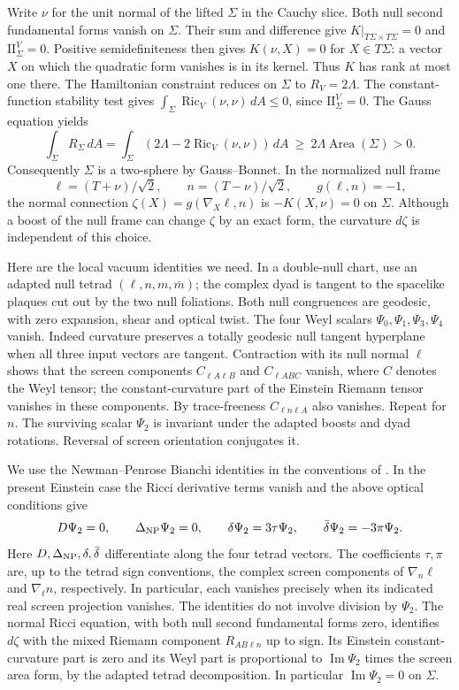 \documentclass[11pt]{article}
\DeclareMathOperator{\Ric}{Ric}
\begin{document}
Write $\nu$ for the unit normal of the lifted $\Sigma$ in the Cauchy
slice. Both null second fundamental forms vanish on $\Sigma$.
Their sum and difference give $K|_{T\Sigma\times T\Sigma}=0$ and
$\mathrm{II}^{V}_\Sigma=0$. Positive semidefiniteness then gives
$K(\nu,X)=0$ for $X\in T\Sigma$: a vector $X$ on which the quadratic
form vanishes is in its kernel. Thus $K$ has rank at most one there.
The Hamiltonian constraint reduces on $\Sigma$ to $R_V=2\Lambda$.
The constant-function stability test gives
$\int_\Sigma \Ric_V(\nu,\nu)\,dA\leq0$, since
$\mathrm{II}^{V}_\Sigma=0$. The Gauss equation yields
\[
 \int_\Sigma R_\Sigma\,dA
   =\int_\Sigma (2\Lambda-2\Ric_V(\nu,\nu))\,dA
   \ \geq\ 2\Lambda\operatorname{Area}(\Sigma)>0.
\]
Consequently $\Sigma$ is a two-sphere by Gauss--Bonnet. In the normalized
null frame
\[
 \ell=(T+\nu)/\sqrt2,\qquad n=(T-\nu)/\sqrt2,\qquad g(\ell,n)=-1 ,
\]
the normal connection $\zeta(X)=g(\nabla_X\ell,n)$ is
$-K(X,\nu)=0$ on $\Sigma$. Although a boost of the null frame can
change $\zeta$ by an exact form, the curvature $d\zeta$ is independent
of this choice.

Here are the local vacuum identities we need. In a double-null chart,
use an adapted null tetrad $(\ell,n,m,\bar m)$; the complex dyad is
tangent to the spacelike plaques cut out by the two null foliations.
Both null congruences are geodesic, with zero expansion, shear and
optical twist. The four Weyl scalars
$\Psi_0,\Psi_1,\Psi_3,\Psi_4$ vanish. Indeed curvature preserves a
totally geodesic null tangent hyperplane when all three input vectors
are tangent. Contraction with its null normal $\ell$ shows that the
screen components $C_{\ell A\ell B}$ and $C_{\ell ABC}$ vanish,
where $C$ denotes the Weyl tensor; the constant-curvature part of
the Einstein Riemann tensor vanishes in these components. By
trace-freeness $C_{\ell n\ell A}$ also vanishes. Repeat for $n$.
The surviving scalar $\Psi_2$ is invariant under the adapted boosts
and dyad rotations. Reversal of screen orientation conjugates it.

We use the Newman--Penrose Bianchi identities in the conventions
of \cite[Appendix A, Eqs.~(A24), (A25), (A28), (A29)]{NP}. In the
present Einstein case the Ricci derivative terms vanish and the
above optical conditions give
\begin{equation}\label{eq:bianchi}
 D\Psi_2=0,\qquad \Delta_{\rm NP}\Psi_2=0,\qquad
 \delta\Psi_2=3\tau\Psi_2,\qquad
 \bar\delta\Psi_2=-3\pi\Psi_2 .
\end{equation}
Here $D,\Delta_{\rm NP},\delta,\bar\delta$ differentiate along the
four tetrad vectors. The coefficients $\tau,\pi$ are, up to the
tetrad sign conventions, the complex screen components of
$\nabla_n\ell$ and $\nabla_\ell n$, respectively. In particular,
each vanishes precisely when its indicated real screen projection
vanishes. The identities do not involve division by $\Psi_2$.
The normal Ricci equation, with both null second fundamental forms
zero, identifies $d\zeta$ with the mixed Riemann component
$R_{AB\ell n}$ up to sign. Its Einstein constant-curvature part is
zero and its Weyl part is proportional to $\operatorname{Im}\Psi_2$
times the screen area form, by the adapted tetrad decomposition.
In particular $\operatorname{Im}\Psi_2=0$ on $\Sigma$.
\end{document}
